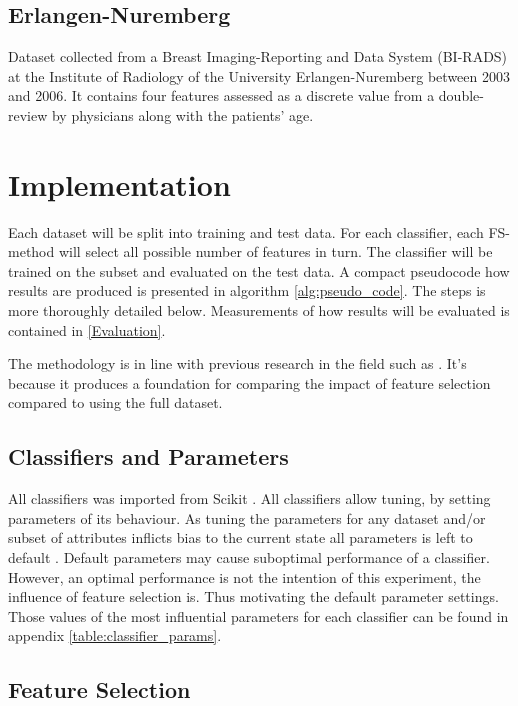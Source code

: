 \subsection{Erlangen-Nuremberg}

Dataset collected from a Breast Imaging-Reporting and Data System (BI-RADS) at the Institute of Radiology of the University Erlangen-Nuremberg between 2003 and 2006. It contains four features assessed as a discrete value from a double-review by physicians along with the patients' age.


\section{Implementation}

Each dataset will be split into training and test data. For each classifier, each FS-method will select all possible number of features in turn. The classifier will be trained on the subset and evaluated on the test data. A compact pseudocode how results are produced is presented in algorithm \ref{alg:pseudo_code}. The steps is more thoroughly detailed below. Measurements of how results will be evaluated is contained in \ref{Evaluation}.

The methodology is in line with previous research in the field such as \parencite{karabulut2012}. It's because it produces a foundation for comparing the impact of feature selection compared to using the full dataset.



\subsection{Classifiers and Parameters}
All classifiers was imported from Scikit \parencite{scikit-learn}. All classifiers allow tuning, by setting parameters of its behaviour. As tuning the parameters for any dataset and/or subset of attributes inflicts bias to the current state all parameters is left to default \parencite{Daelemans2003}. Default parameters may cause suboptimal performance of a classifier. However, an optimal performance is not the intention of this experiment, the influence of feature selection is. Thus motivating the default parameter settings. Those values of the most influential parameters for each classifier can be found in appendix \ref{table:classifier_params}.


\subsection{Feature Selection}

